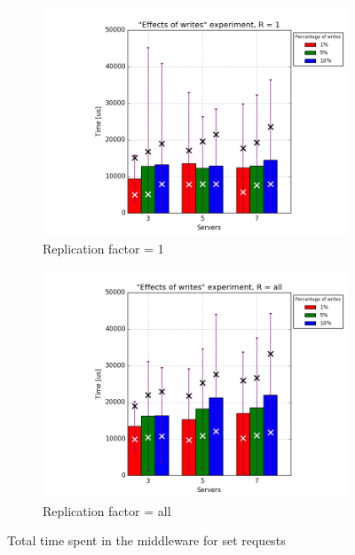 \documentclass[11pt]{article}
\begin{document}
\begin{figure}
\centering
\begin{subfigure}{.5\textwidth}
	\centering
	\includegraphics[width=\linewidth]{plots/writes-set-1-replication}
	\caption{Replication factor = 1}
	\label{fig:writes-set-1}
\end{subfigure}%
\begin{subfigure}{.5\textwidth}
	\centering
	\includegraphics[width=\linewidth]{plots/writes-set-2-replication}
	\caption{Replication factor = all}
	\label{fig:writes-set-2}
\end{subfigure}
\caption{Total time spent in the middleware for set requests}
\label{fig:writes-set}
\end{figure}
\end{document}
